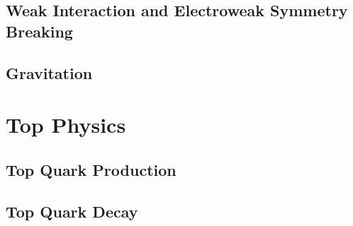 \subsection{Weak Interaction and Electroweak Symmetry Breaking}
\subsection{Gravitation}

\section{Top Physics}
\subsection{Top Quark Production}
\subsection{Top Quark Decay}
